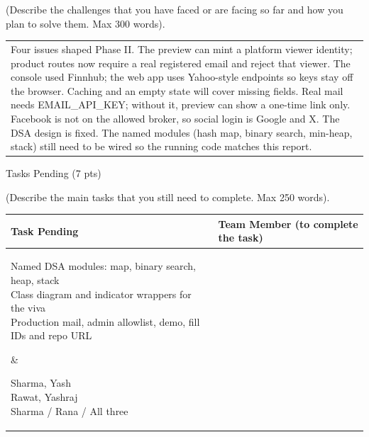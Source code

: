 \documentclass[12pt,a4paper]{article}
\newcommand{\sectiontitle}[1]{%
    {\color{GEUBlue}
    \fontsize{18}{22}\selectfont #1}
}
\newcommand{\instruction}[1]{%
    {\color{InstructionGrey}
    \fontsize{10.5}{13}\selectfont #1}
}
\newcommand{\answerbox}[2]{%
    \begin{tabularx}{\textwidth}{
        |>{\raggedright\arraybackslash}X|}
        \hline
        \parbox[t][#1][t]{\dimexpr\linewidth-12pt\relax}{
            \vspace{5pt}
            \fontsize{11}{13}\selectfont #2
        }\\
        \hline
    \end{tabularx}
}
\begin{document}
\vspace{0.05cm}

\instruction{
(Describe the challenges that you have faced or are facing so far
and how you plan to solve them. Max 300 words).
}

\vspace{0.18cm}

\answerbox{4.05cm}{Four issues shaped Phase II. The preview can mint a platform viewer identity; product routes now require a real registered email and reject that viewer. The console used Finnhub; the web app uses Yahoo-style endpoints so keys stay off the browser. Caching and an empty state will cover missing fields. Real mail needs EMAIL\_API\_KEY; without it, preview can show a one-time link only. Facebook is not on the allowed broker, so social login is Google and X. The DSA design is fixed. The named modules (hash map, binary search, min-heap, stack) still need to be wired so the running code matches this report.}

\vspace{0.65cm}

\sectiontitle{Tasks Pending (7 pts)}

\vspace{0.05cm}

\instruction{
(Describe the main tasks that you still need to complete.
Max 250 words).
}

\vspace{0.18cm}

\begin{tabularx}{\textwidth}{
|>{\raggedright\arraybackslash}X
|>{\raggedright\arraybackslash}X|
}
\hline

\textbf{Task Pending} &
\textbf{Team Member (to complete the task)}
\\
\hline

\parbox[t][1.25cm][t]{\linewidth}{\vspace{1pt}\fontsize{8}{9.5}\selectfont
Named DSA modules: map, binary search, heap, stack\\
Class diagram and indicator wrappers for the viva\\
Production mail, admin allowlist, demo, fill IDs and repo URL}
&
\parbox[t][1.25cm][t]{\linewidth}{\vspace{1pt}\fontsize{8}{9.5}\selectfont
Sharma, Yash\\
Rawat, Yashraj\\
Sharma / Rana / All three}
\\
\hline

\end{tabularx}
\end{document}

